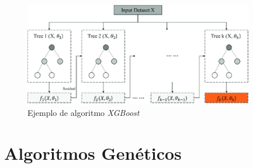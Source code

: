\begin{figure}[H]
	\centering
	\includegraphics[width=10cm]{Figures/Background/XGBoost-model-process.png}
	\caption{Ejemplo de algoritmo \textit{XGBoost}}
	\label{XGBOOST_BACKGROUND}
\end{figure}









\section{Algoritmos Genéticos}


